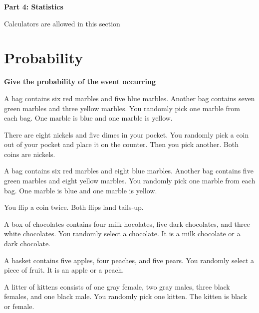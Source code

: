 \documentclass{article}
\begin{document}
\begin{center}
	{\huge \textbf{Part 4: Statistics}}

	Calculators are allowed in this section
\end{center}

\bigskip

\section{Probability}

\bigskip

\textbf{Give the probability of the event occurring}

\bigskip

	\indent A bag contains six red marbles and five blue marbles. Another bag contains seven green marbles and three yellow marbles. You randomly pick one marble from each bag. One marble is blue and one marble is yellow.

	\bigskip

	\bigskip

	\indent There are eight nickels and five dimes in your pocket. You randomly pick a coin out of your pocket and place it on the counter. Then you pick another. Both coins are nickels.

	\bigskip

	\bigskip

	\indent A  bag contains six red marbles and eight blue marbles. Another bag contains five green marbles and eight yellow marbles. You randomly pick one marble from each bag. One marble is blue and one marble is yellow.

	\bigskip

	\bigskip

	\indent You flip a coin twice. Both flips land tails-up.

	\bigskip

	\bigskip

	\indent A box of chocolates contains four milk hocolates, five dark chocolates, and three white chocolates. You randomly select a chocolate. It is a milk chocolate or a dark chocolate.

	\bigskip

	\bigskip

	\indent A basket contains five apples, four peaches, and five pears. You randomly select a piece of fruit. It is an apple or a peach.

	\bigskip

	\bigskip

	\indent A litter of kittens consists of one gray female, two gray males, three black females, and one black male.
You randomly pick one kitten. The kitten is black or female.
	
\end{document}

